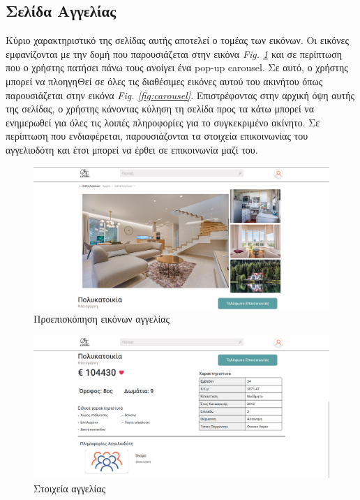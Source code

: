 \documentclass[manuscript,screen,review, language=greek, language=english]{acmart}
\begin{document}
\subsection{Σελίδα Αγγελίας}
	Κύριο χαρακτηριστικό της σελίδας αυτής αποτελεί ο τομέας των εικόνων. Οι εικόνες
	εμφανίζονται με την δομή που παρουσιάζεται στην εικόνα
	\emph{Fig. \ref{fig:listing_preview}} και
	σε περίπτωση που ο χρήστης πατήσει πάνω τους ανοίγει ένα pop-up carousel. Σε αυτό, ο
	χρήστης μπορεί να πλοηγηΘεί σε όλες τις διαθέσιμες εικόνες αυτού του ακινήτου όπως
	παρουσιάζεται στην εικόνα \emph{Fig. \ref{fig:carousel}}.
	Επιστρέφοντας στην αρχική όψη αυτής της σελίδας, ο χρήστης κάνοντας κύληση τη σελίδα
	προς τα
	κάτω μπορεί να ενημερωθεί για όλες τις λοιπές πληροφορίες για το συγκεκριμένο
	ακίνητο. Σε περίπτωση που ενδιαφέρεται, παρουσιάζονται τα στοιχεία επικοινωνίας του
	αγγελιοδότη και έτσι μπορεί να έρθει σε επικοινωνία μαζί του.

	\begin{figure}[H]
		   \includegraphics[width=\textwidth]{listing_page1.png}
		   \caption{Προεπισκόπηση εικόνων αγγελίας}
		   \label{fig:listing_preview}
	\end{figure}

	\begin{figure}[H]
		   \includegraphics[width=\textwidth]{listing_page2.png}
		   \caption{Στοιχεία αγγελίας}
		   \label{fig:listing_info}
	\end{figure}
\end{document}
